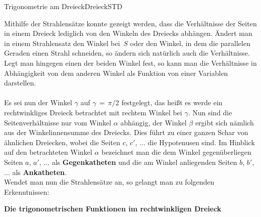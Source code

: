 \begin{MXContent}{Trigonometrie am Dreieck}{Dreieck}{STD}

Mithilfe der Strahlens\"atze konnte gezeigt werden, dass die Verh\"altnisse der
Seiten in einem Dreieck lediglich von den Winkeln des Dreiecks abh\"angen. \"Andert man
in einem Strahlensatz den Winkel bei~$S$ oder den Winkel, in dem die
parallelen Geraden einen Strahl schneiden, so \"andern sich nat\"urlich
auch die Verh\"altnisse.
Legt man hingegen einen der beiden Winkel fest, so kann man die
Verh\"altnisse in Abh\"angigkeit von dem anderen Winkel als Funktion
von einer Variablen darstellen.\\
\ \\
Es sei nun der Winkel $\gamma$ auf $\gamma\,=\,\pi/2$ festgelegt, das hei\ss t es werde ein rechtwinkliges Dreieck betrachtet mit rechtem Winkel bei $\gamma$. Nun sind die Seitenverh\"altnisse nur vom Winkel $\alpha$ abh\"angig, der Winkel $\beta$ ergibt sich n\"amlich aus der Winkelinnensumme des Dreiecks. Dies f\"uhrt zu einer ganzen Schar von \"ahnlichen Dreiecken, wobei die Seiten $c$, $c'$, $\ldots$ die Hypotenusen sind. Im Hinblick auf den betrachteten Winkel $\alpha$ bezeichnet man die dem Winkel gegen\"uberliegen Seiten
$a$, $a'$, $\ldots$ als \textbf{Gegenkatheten} und die am Winkel anliegenden Seiten $b$, $b'$, $\ldots$ als \textbf{Ankatheten}.\\
Wendet man nun die Strahlens\"atze an, so gelangt man zu folgenden Erkenntnissen: 

\begin{MInfo}%
\textbf{Die trigonometrischen Funktionen im rechtwinkligen Dreieck}


\end{MInfo}
\end{MXContent}
